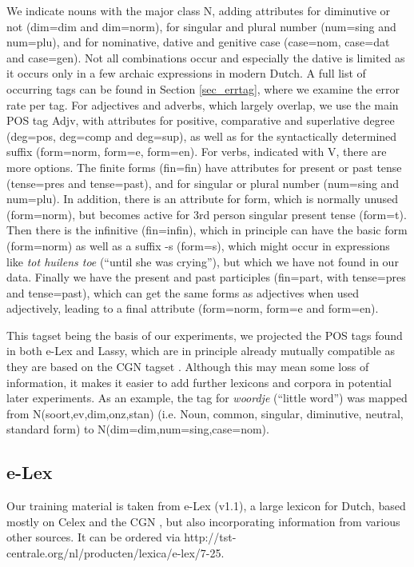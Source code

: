\documentclass[a4paper,10pt,twoside]{article}
\begin{document}
We indicate nouns with the major class N, adding attributes for diminutive or not (dim=dim and dim=norm), for singular and plural number (num=sing and num=plu), and for nominative, dative and genitive case (case=nom, case=dat and case=gen). Not all combinations occur and especially the dative is limited as it occurs only in a few archaic expressions in modern Dutch. A full list of occurring tags can be found in Section \ref{sec_errtag}, where we examine the error rate per tag. For adjectives and adverbs, which largely overlap, we use the main POS tag Adjv, with attributes for positive, comparative and superlative degree (deg=pos, deg=comp and deg=sup), as well as for the syntactically determined suffix (form=norm, form=e, form=en). For verbs, indicated with V, there are more options. The finite forms (fin=fin) have attributes for present or past tense (tense=pres and tense=past), and for singular or plural number (num=sing and num=plu). In addition, there is an attribute for form, which is normally unused (form=norm), but becomes active for 3rd person singular present tense (form=t). Then there is the infinitive (fin=infin), which in principle can have the basic form (form=norm) as well as a suffix -s (form=s), which might occur in expressions like \textit{tot huilens toe} (``until she was crying''), but which we have not found in our data. Finally we have the present and past participles (fin=part, with tense=pres and tense=past), which can get the same forms as adjectives when used adjectively, leading to a final attribute (form=norm, form=e and form=en).

This tagset being the basis of our experiments, we projected the POS tags found in both e-Lex and Lassy, which are in principle already mutually compatible as they are based on the CGN tagset \cite{REFcgntags}. Although this may mean some loss of information, it makes it easier to add further lexicons and corpora in potential later experiments. As an example, the tag  for \textit{woordje} (``little word'') was mapped from N(soort,ev,dim,onz,stan) (i.e. Noun, common, singular, diminutive, neutral, standard form) to N(dim=dim,num=sing,case=nom).


\subsection{e-Lex}
\label{sec_elex}

Our training material is taken from e-Lex (v1.1), a large lexicon for Dutch, based mostly on Celex \cite{REFcelex} and the CGN \cite{REFcgn}, but also incorporating information from various other sources. It can be ordered via http://tst-centrale.org/nl/producten/lexica/e-lex/7-25. 
\end{document}
